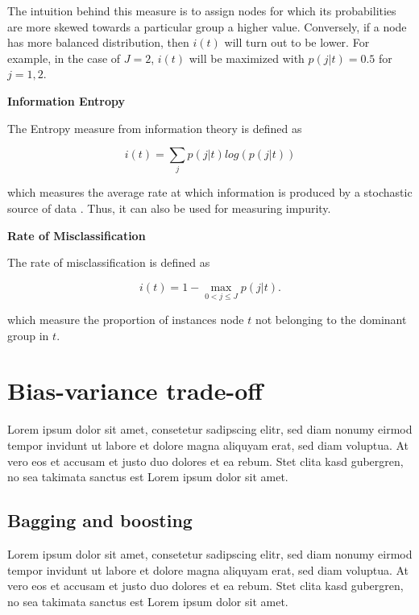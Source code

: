 The intuition behind this measure is to assign nodes for which its probabilities are more skewed towards a particular group a higher value.
Conversely, if a node has more balanced distribution, then \(i(t)\) will turn out to be lower.
For example, in the case of \( J=2 \), \(i(t)\) will be maximized with \( p(j|t) = 0.5 \) for \(j = 1, 2\).


\textbf{Information Entropy}

The Entropy measure from information theory is defined as

\begin{equation}
    i(t) = \sum_{j} p(j|t) log(p(j|t))
\end{equation}

which measures the average rate at which information is produced by a stochastic source of data .
Thus, it can also be used for measuring impurity.

\newpage

\textbf{Rate of Misclassification}

The rate of misclassification is defined as 

\begin{equation}
    i(t) = 1 - \max_{0 < j \leq J} p(j|t) .
\end{equation}

which measure the proportion of instances node \(t\) not belonging to the dominant group in \(t\).


\section{Bias-variance trade-off}
Lorem ipsum dolor sit amet, consetetur sadipscing elitr, 
sed diam nonumy eirmod tempor invidunt ut labore et dolore magna aliquyam erat, sed diam voluptua.
At vero eos et accusam et justo duo dolores et ea rebum. Stet clita kasd gubergren,
no sea takimata sanctus est Lorem ipsum dolor sit amet.

\subsection{Bagging and boosting}
Lorem ipsum dolor sit amet, consetetur sadipscing elitr, 
sed diam nonumy eirmod tempor invidunt ut labore et dolore magna aliquyam erat, sed diam voluptua.
At vero eos et accusam et justo duo dolores et ea rebum. Stet clita kasd gubergren,
no sea takimata sanctus est Lorem ipsum dolor sit amet.